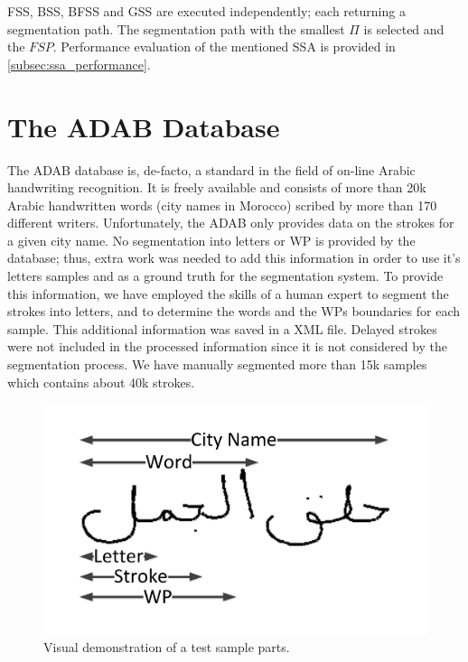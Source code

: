 \documentclass[10pt, conference, compsocconf]{IEEEtran}
\begin{document}
FSS, BSS, BFSS and GSS are executed independently; each returning a segmentation path. The segmentation path with the smallest $\Pi$ is selected and the $FSP$. Performance evaluation of the mentioned SSA is provided in \ref{subsec:ssa_performance}. \\



\section{The ADAB Database}
\label{sec:database}
The ADAB database is, de-facto, a standard in the field of on-line Arabic handwriting recognition. It is freely available and consists of more than 20k Arabic handwritten words (city names in Morocco) scribed by more than 170 different writers. 
Unfortunately, the ADAB only provides data on the strokes for a given city name. 
No segmentation into letters or WP is provided by the database; thus, extra work was needed to add this information in order to use it's letters samples and as a ground truth for the segmentation system.
To provide this information, we have employed the skills of a human expert to segment the strokes into letters, and to determine the words and the WPs boundaries for each sample. 
This additional information was saved in a XML file. Delayed strokes were not included in the processed information since it is not considered by the segmentation process.
We have manually segmented more than 15k samples which contains about 40k strokes. \\

\begin{figure}
\centering
\includegraphics[width=0.6\columnwidth]{./figures/sample_parts}
\caption{Visual demonstration of a test sample parts.}
\label{fig:sample_parts}
\end{figure}
\end{document}
